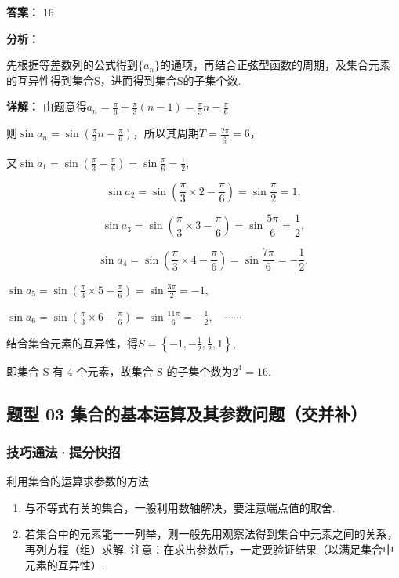 \documentclass[11pt,a4paper]{ctexart}
\begin{document}
\textbf{答案：}
16

\textbf{分析：}

先根据等差数列的公式得到\(\{a_{n}\}\)的通项，再结合正弦型函数的周期，及集合元素的互异性得到集合S，进而得到集合S的子集个数.

\textbf{详解：}
由题意得\(a_{n}=\frac{\pi}{6}+\frac{\pi}{3}(n-1)=\frac{\pi}{3}n-\frac{\pi}{6}\)

则\(\sin a_{n}=\sin\left(\frac{\pi}{3}n-\frac{\pi}{6}\right)\)，所以其周期\(T=\frac{2\pi}{\frac{\pi}{3}}=6\)，

又\(\sin a_{1}=\sin\left(\frac{\pi}{3}-\frac{\pi}{6}\right)=\sin\frac{\pi}{6}=\frac{1}{2},\)

\[
\sin a _ {2} = \sin \left(\frac {\pi}{3} \times 2 - \frac {\pi}{6}\right) = \sin \frac {\pi}{2} = 1,
\]

\[
\sin a _ {3} = \sin \left(\frac {\pi}{3} \times 3 - \frac {\pi}{6}\right) = \sin \frac {5 \pi}{6} = \frac {1}{2},
\]

\[
\sin a _ {4} = \sin \left(\frac {\pi}{3} \times 4 - \frac {\pi}{6}\right) = \sin \frac {7 \pi}{6} = - \frac {1}{2},
\]

\(\sin a_{5} = \sin\left(\frac{\pi}{3} \times 5 - \frac{\pi}{6}\right) = \sin\frac{3\pi}{2} = -1,\)

\(\sin a_{6} = \sin\left(\frac{\pi}{3} \times 6 - \frac{\pi}{6}\right) = \sin\frac{11\pi}{6} = -\frac{1}{2}, \quad \cdots\cdots\)

结合集合元素的互异性，得\(S=\left\{-1,-\frac{1}{2},\frac{1}{2},1\right\}\),

即集合 S 有 4 个元素，故集合 S 的子集个数为\(2^{4} = 16\).\subsection{题型 03
集合的基本运算及其参数问题（交并补）}\label{ux9898ux578b-03-ux96c6ux5408ux7684ux57faux672cux8fd0ux7b97ux53caux5176ux53c2ux6570ux95eeux9898ux4ea4ux5e76ux8865}

\subsubsection{技巧通法·提分快招}\label{ux6280ux5de7ux901aux6cd5ux63d0ux5206ux5febux62db-2}

\begin{methodbox}{利用集合的运算求参数的方法}

\begin{enumerate}[label=(\arabic*), leftmargin=*]
    \item 与不等式有关的集合，一般利用数轴解决，要注意端点值的取舍.
    \item 若集合中的元素能一一列举，则一般先用观察法得到集合中元素之间的关系，再列方程（组）求解. 注意：在求出参数后，一定要验证结果（以满足集合中元素的互异性）.
  \end{enumerate}
\end{methodbox}
\end{document}
